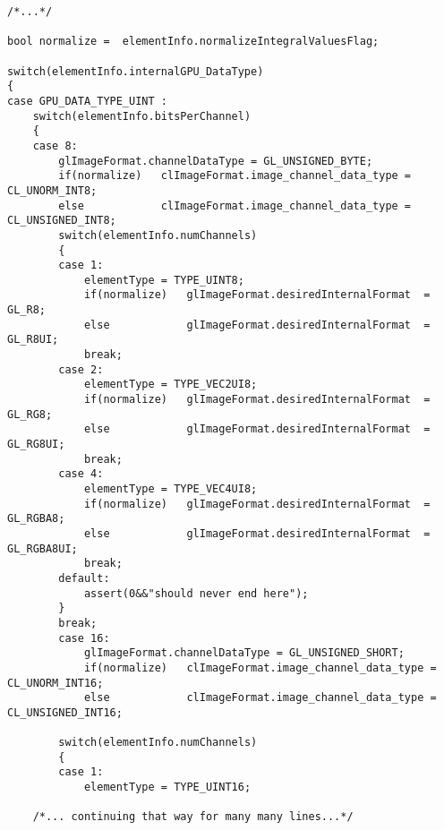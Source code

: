 \begin{lstlisting}[caption={Mapping von BufferElementInfo-Members zu OpenGL/OpenCL-Makros, exemplarischer Ausschnitt},label=listing:BufferElementInfoToCLGL]	
/*...*/		
		
bool normalize =  elementInfo.normalizeIntegralValuesFlag;

switch(elementInfo.internalGPU_DataType)
{
case GPU_DATA_TYPE_UINT :
	switch(elementInfo.bitsPerChannel)
	{
	case 8:
		glImageFormat.channelDataType = GL_UNSIGNED_BYTE;
		if(normalize)	clImageFormat.image_channel_data_type = CL_UNORM_INT8;
		else			clImageFormat.image_channel_data_type = CL_UNSIGNED_INT8;
		switch(elementInfo.numChannels)
		{
		case 1:
			elementType = TYPE_UINT8;
			if(normalize)	glImageFormat.desiredInternalFormat  = GL_R8;
			else			glImageFormat.desiredInternalFormat  = GL_R8UI;
			break;
		case 2:
			elementType = TYPE_VEC2UI8;
			if(normalize)	glImageFormat.desiredInternalFormat  = GL_RG8;
			else			glImageFormat.desiredInternalFormat  = GL_RG8UI;
			break;
		case 4:
			elementType = TYPE_VEC4UI8;
			if(normalize)	glImageFormat.desiredInternalFormat  = GL_RGBA8;
			else			glImageFormat.desiredInternalFormat  = GL_RGBA8UI;
			break;
		default:
			assert(0&&"should never end here");
		}
		break;
		case 16:
			glImageFormat.channelDataType = GL_UNSIGNED_SHORT;
			if(normalize)	clImageFormat.image_channel_data_type = CL_UNORM_INT16;
			else			clImageFormat.image_channel_data_type = CL_UNSIGNED_INT16;

		switch(elementInfo.numChannels)
		{
		case 1:
			elementType = TYPE_UINT16;
						
	/*... continuing that way for many many lines...*/	
\end{lstlisting}


